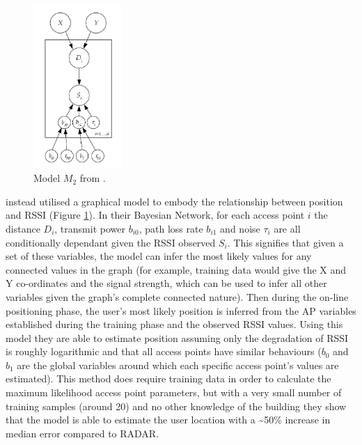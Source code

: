 \documentclass{UoYCSproject}
\begin{document}
                \begin{figure}[h]
                    \label{fig:m2}
                    \caption{Model $M_2$ from \citet{madigan2005bayesian}.}
                    \centering
                        \includegraphics[width=0.3\textwidth]{Model_M2.png}
                \end{figure}
                
                \citet{madigan2005bayesian} instead utilised a graphical model to embody the relationship between position and RSSI (Figure \ref{fig:m2}). In their Bayesian Network, for each access point $i$ the distance $D_i$, transmit power $b_{i0}$, path loss rate $b_{i1}$ and noise $\tau_i$ are all conditionally dependant given the RSSI observed $S_i$. This signifies that given a set of these variables, the model can infer the most likely values for any connected values in the graph (for example, training data would give the X and Y co-ordinates and the signal strength, which can be used to infer all other variables given the graph's complete connected nature). Then during the on-line positioning phase, the user's most likely position is inferred from the AP variables established during the training phase and the observed RSSI values. Using this model they are able to estimate position assuming only the degradation of RSSI is roughly logarithmic and that all access points have similar behaviours ($b_0$ and $b_1$ are the global variables around which each specific access point's values are estimated). This method does require training data in order to calculate the maximum likelihood access point parameters, but with a very small number of training samples (around 20) and no other knowledge of the building they show that the model is able to estimate the user location with a \textasciitilde50\% increase in median error compared to RADAR.
                
\end{document}
